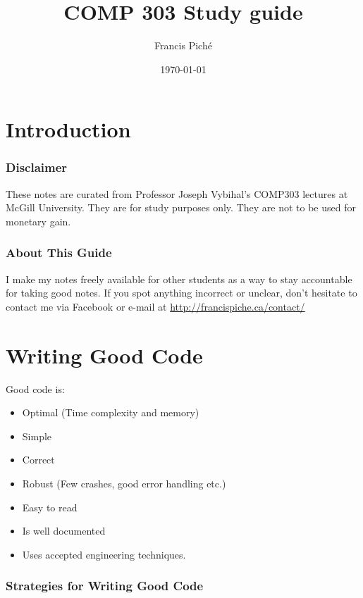 \documentclass[12pt]{article}
\theoremstyle{definition}
\begin{document}
\title{COMP 303 Study guide}
\author{Francis Pich\'e}
\date{\today}
\maketitle
\newpage
\tableofcontents
\newpage

\part{Introduction}
\section{Disclaimer}
These notes are curated from Professor Joseph Vybihal's COMP303 lectures at McGill University. They are for study purposes only. They are not to be used for monetary gain.
\section{About This Guide}
I make my notes freely available for other students as a way to stay accountable for taking good notes. If you spot anything incorrect or unclear, don't hesitate to contact me via Facebook or e-mail at \url{http://francispiche.ca/contact/}
\part{Writing Good Code}
Good code is:
\begin{itemize}
	\item Optimal (Time complexity and memory)
	\item Simple
	\item Correct
	\item Robust (Few crashes, good error handling etc.)
	\item Easy to read
	\item Is well documented
	\item Uses accepted engineering techniques.
\end{itemize}
\section{Strategies for Writing Good Code}
\end{document}
